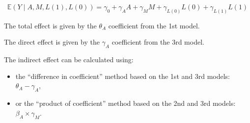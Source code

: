 \documentclass[
]{book}
\providecommand{\tightlist}{%
  \setlength{\itemsep}{0pt}\setlength{\parskip}{0pt}}
\begin{document}
\begin{equation*}
    \mathbb{E}(Y \mid A,M,L(1),L(0)) = \gamma_0 + \gamma_A A + \gamma_M M + \gamma_{L(0)} L(0) + \gamma_{L(1)} L(1)
  \end{equation*}

The total effect is given by the \(\theta_A\) coefficient from the 1st model.

The direct effect is given by the \(\gamma_A\) coefficient from the 3rd model.

The indirect effect can be calculated using:

\begin{itemize}
\tightlist
\item
  the ``difference in coefficient'' method based on the 1st and 3rd models: \(\theta_A - \gamma_A\),
\item
  or the ``product of coefficient'' method based on the 2nd and 3rd models: \(\beta_A \times \gamma_M\).
\end{itemize}
\end{document}
